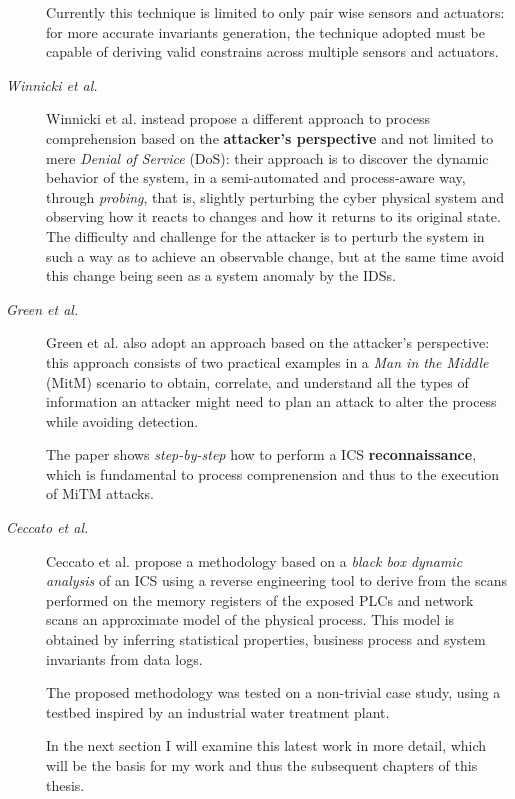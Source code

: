 \begin{description}
	Currently this technique is limited to only pair wise sensors and actuators: for more accurate invariants generation, the technique adopted must be capable of deriving valid constrains across multiple sensors and actuators.
	
	\item[\textit{Winnicki et al.}] Winnicki et al. \cite{winnicki_et_al} instead propose a different approach to process comprehension based on the \textbf{attacker's perspective} and not limited to mere \textit{Denial of Service} (DoS): their approach is to discover the dynamic behavior of the system, in a semi-automated and process-aware way, through \textit{probing}, that is, slightly perturbing the cyber physical system and observing how it reacts to changes and how it returns to its original state. The difficulty and challenge for the attacker is to perturb the system in such a way as to achieve an observable change, but at the same time avoid this change being seen as a system anomaly by the IDSs.
	
	\item[\textit{Green et al.}] Green et al. \cite{green_et_al} also adopt an approach based on the attacker's perspective: this approach consists of two practical examples in a \textit{Man in the Middle} (MitM) scenario to obtain, correlate, and understand all the types of information an attacker might need to plan an attack to alter the process while avoiding detection.
	
	The paper shows \textit{step-by-step} how to perform a ICS \textbf{reconnaissance}, which is fundamental to process comprenension and thus to the execution of MiTM attacks.
	
	\item[\textit{Ceccato et al.}] Ceccato et al. \cite{ceccato} propose a methodology based on a \textit{black box dynamic analysis} of an ICS using a reverse engineering tool to derive from the scans performed on the memory registers of the exposed PLCs and network scans an approximate model of the physical process. This model is obtained by inferring statistical properties, business process and system invariants from data logs.
	
	The proposed methodology was tested on a non-trivial case study, using a testbed inspired by an industrial water treatment plant.
	
	In the next section I will examine this latest work in more detail, which will be the basis for my work and thus the subsequent chapters of this thesis.

\end{description}

